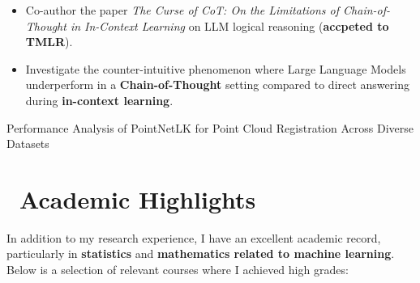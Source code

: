 \documentclass[colorlinks, linkcolor=blue]{resume}
\begin{document}
\begin{itemize}
    \item Co-author the paper \textit{The Curse of CoT: On the Limitations of Chain-of-Thought in In-Context Learning} on LLM logical reasoning (\textbf{accpeted to TMLR}).
    \item Investigate the counter-intuitive phenomenon where Large Language Models underperform in a \textbf{Chain-of-Thought}  setting compared to direct answering during \textbf{in-context learning}.

\end{itemize}
Performance Analysis of PointNetLK for Point Cloud
Registration Across Diverse Datasets
\section{\faGraduationCap\ Academic Highlights}

In addition to my research experience, I have an excellent academic record, particularly in \textbf{statistics} and \textbf{mathematics related to machine learning}. Below is a selection of relevant courses where I achieved high grades:
\end{document}
